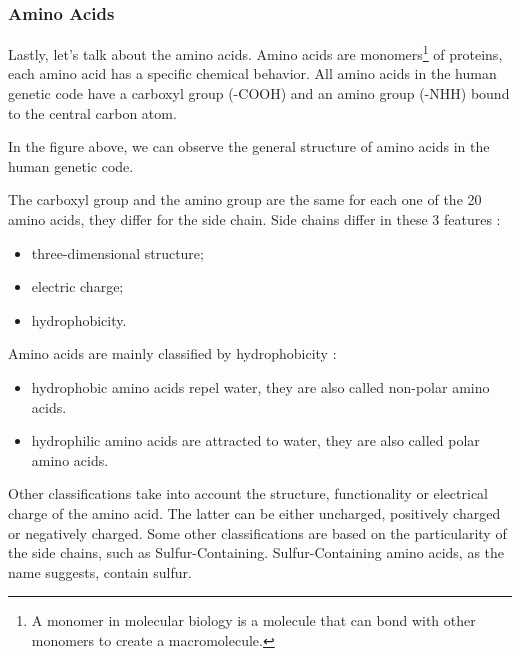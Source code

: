 \subsubsection{Amino Acids}
Lastly, let's talk about the amino acids.
Amino acids are monomers\footnote{A monomer in molecular biology is a molecule that can bond with other monomers to create a macromolecule. } of proteins, each amino acid has a specific chemical behavior.
All amino acids in the human genetic code have a carboxyl group (-COOH) and an amino group (-NHH) bound to the central carbon atom. 

\vspace{2em}


In the figure above, we can observe the general structure of amino acids in the human genetic code.

The carboxyl group and the amino group are the same for each one of the 20 amino acids, they differ for the side chain. Side chains differ in these 3 features :
\begin{itemize}
	\item three-dimensional structure;
	\item electric charge;
	\item hydrophobicity.
\end{itemize}

Amino acids are mainly classified by hydrophobicity :
\begin{itemize}
	\item hydrophobic amino acids repel water, they are also called non-polar amino acids. 
	\item hydrophilic amino acids are attracted to water, they are also called polar amino acids.
\end{itemize}
\pagebreak
Other classifications take into account the structure, functionality or electrical charge of the amino acid. The latter can be either uncharged, positively charged or negatively charged.
Some other classifications are based on the particularity of the side chains, such as Sulfur-Containing. Sulfur-Containing amino acids, as the name suggests, contain sulfur. 

